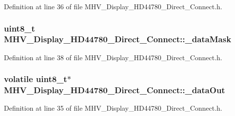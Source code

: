 \-Definition at line 36 of file \-M\-H\-V\-\_\-\-Display\-\_\-\-H\-D44780\-\_\-\-Direct\-\_\-\-Connect.\-h.

\hypertarget{class_m_h_v___display___h_d44780___direct___connect_afbadbde61cef93fe49e29e4b4de37ea2}{
\subsubsection[{\-\_\-data\-Mask}]{\setlength{\rightskip}{0pt plus 5cm}uint8\-\_\-t {\bf \-M\-H\-V\-\_\-\-Display\-\_\-\-H\-D44780\-\_\-\-Direct\-\_\-\-Connect\-::\-\_\-data\-Mask}}}
\label{class_m_h_v___display___h_d44780___direct___connect_afbadbde61cef93fe49e29e4b4de37ea2}


\-Definition at line 38 of file \-M\-H\-V\-\_\-\-Display\-\_\-\-H\-D44780\-\_\-\-Direct\-\_\-\-Connect.\-h.

\hypertarget{class_m_h_v___display___h_d44780___direct___connect_aebdad9827430f3471e92c96ac162a0e8}{
\subsubsection[{\-\_\-data\-Out}]{\setlength{\rightskip}{0pt plus 5cm}volatile uint8\-\_\-t$\ast$ {\bf \-M\-H\-V\-\_\-\-Display\-\_\-\-H\-D44780\-\_\-\-Direct\-\_\-\-Connect\-::\-\_\-data\-Out}}}
\label{class_m_h_v___display___h_d44780___direct___connect_aebdad9827430f3471e92c96ac162a0e8}


\-Definition at line 35 of file \-M\-H\-V\-\_\-\-Display\-\_\-\-H\-D44780\-\_\-\-Direct\-\_\-\-Connect.\-h.

